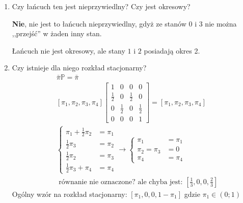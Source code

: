 \documentclass[a4paper,12pt]{article}
\theoremstyle{definition}%
\theoremstyle{definition}
\theoremstyle{problem}
\begin{document}
\begin{enumerate}[label=\alph*)]
\item Czy łańcuch ten jest nieprzywiedlny? Czy jest okresowy?

\textbf{Nie}, nie jest to łańcuch nieprzywiedlny, gdyż ze stanów $0$ i $3$ nie można ,,przejść'' w żaden inny stan.


Łańcuch nie jest okresowy, ale stany $1$ i $2$ posiadają okres 2.

\item Czy istnieje dla niego rozkład stacjonarny?
\begin{align*}
&\bar{\pi}\mathbb{P}=\bar{\pi}\\
&\left[\pi _1, \pi _2,\pi _3,\pi _4\right]\begin{bmatrix}
1&0&0&0\\
\frac{1}{2}&0&\frac{1}{2}&0\\
0&\frac{1}{2}&0&\frac{1}{2}\\
0&0&0&1
\end{bmatrix}=\left[\pi _1, \pi _2,\pi _3,\pi _4\right]\\
&\left\{\begin{matrix}
\pi _1 + \frac{1}{2} \pi _2 &= \pi _1\\
\frac{1}{2} \pi _3 &= \pi _2\\
\frac{1}{2} \pi _2 &= \pi _3\\
\frac{1}{2} \pi _3 + \pi _4 &= \pi _4
\end{matrix}\right. \rightarrow \left\{\begin{matrix}
\pi _1  &= \pi _1\\
\pi _2 = \pi _3 &= 0\\
\pi _4 &= \pi _4
\end{matrix}\right.\\
&\text{ równanie nie oznaczone? ale chyba jest: } \left[\frac{1}{3}, 0, 0, \frac{2}{3}\right]
\end{align*}
Ogólny wzór na rozkład stacjonarny: $\left[\pi _1, 0, 0, 1-\pi _1\right]$ gdzie $\pi _1 \in (0; 1)$
\end{enumerate}
\end{document}
